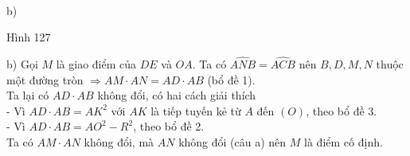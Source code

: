 \begin{vd}
{\begin{minipage}[h]{0.5 \textwidth}
\begin{center}
 \\
				b)
			\end{center}
		\end{minipage}
		\begin{center}
			Hình 127
		\end{center}
		b) Gọi $M$ là giao điểm của $DE$ và $OA$. Ta có $\widehat{ANB}=\widehat{ACB}$ nên $B,D,M,N$ thuộc một đường tròn $\Rightarrow AM \cdot AN =AD \cdot AB$    (bổ đề 1). \\
		Ta lại có $AD \cdot AB$ không đổi, có hai cách giải thích \\
		- Vì $AD \cdot AB=AK^2$  với $AK$ là tiếp tuyến kẻ từ $A$ đến $(O)$, theo bổ đề 3. \\
		- Vì $AD \cdot AB=AO^2-R^2$, theo bổ đề 2. \\
		Ta có $AM \cdot AN$  không đổi, mà $AN$ không đổi (câu a) nên $M$ là điểm cố định.
	}
\end{vd}


